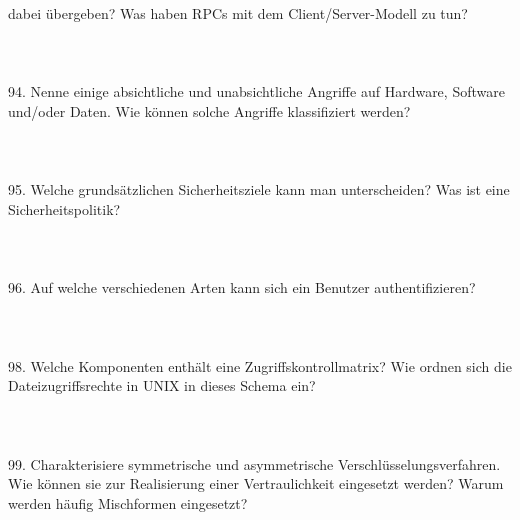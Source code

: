 \documentclass{article}
\begin{document}
dabei übergeben? Was haben RPCs mit dem Client/Server-Modell zu tun?
\\
\\
\\
\\
94. Nenne einige absichtliche und unabsichtliche Angriffe auf Hardware, Software und/oder
Daten. Wie können solche Angriffe klassifiziert werden?
\\
\\
\\
\\
95. Welche grundsätzlichen Sicherheitsziele kann man unterscheiden? Was ist eine Sicherheitspolitik?
\\
\\
\\
\\
96. Auf welche verschiedenen Arten kann sich ein Benutzer authentifizieren?
\\
\\
\\
\\
98. Welche Komponenten enthält eine Zugriffskontrollmatrix? Wie ordnen sich die Dateizugriffsrechte in UNIX in dieses Schema ein?
\\
\\
\\
\\
99. Charakterisiere symmetrische und asymmetrische Verschlüsselungsverfahren. Wie können sie
zur Realisierung einer Vertraulichkeit eingesetzt werden? Warum werden häufig Mischformen
eingesetzt?
\end{document}
